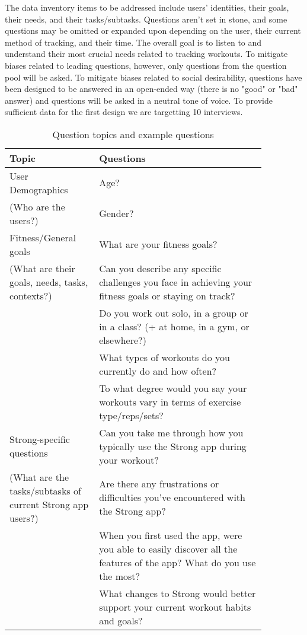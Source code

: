 \documentclass[
	letterpaper, %
]{jdf}
\begin{document}
The data inventory items to be addressed include users' identities, their goals, their needs, and their tasks/subtasks. Questions aren't set in stone, and some questions may be omitted or expanded upon depending on the user, their current method of tracking, and their time. The overall goal is to listen to and understand their most crucial needs related to tracking workouts.
To mitigate biases related to leading questions, however, only questions from the question pool will be asked. To mitigate biases related to social desirability, questions have been designed to be answered in an open-ended way (there is no "good" or "bad" answer) and questions will be asked in a neutral tone of voice. To provide sufficient data for the first design we are targetting 10 interviews. 
\begin{table}[H] %
	\caption{Question topics and example questions}
	\small %
	\centering %
	\begin{tabular}{L{0.30\linewidth} L{0.56\linewidth}}
		\textbf{Topic} & \textbf{Questions} \\
		\toprule[0.5pt]
		User Demographics & Age?\\
		(Who are the users?) & Gender?\\
		\midrule
		Fitness/General goals & What are your fitness goals?\\
		(What are their goals, needs, tasks, contexts?)& Can you describe any specific challenges you face in achieving your fitness goals or staying on track?\\
		& Do you work out solo, in a group or in a class? (+ at home, in a gym, or elsewhere?)\\
		& What types of workouts do you currently do and how often?\\
		& To what degree would you say your workouts vary in terms of exercise type/reps/sets?\\
		\midrule
		Strong-specific questions & Can you take me through how you typically use the Strong app during your workout?\\
		(What are the tasks/subtasks of current Strong app users?)& Are there any frustrations or difficulties you've encountered with the Strong app?\\
		& When you first used the app, were you able to easily discover all the features of the app? What do you use the most?\\
		& What changes to Strong would better support your current workout habits and goals?\\

\end{tabular}
\end{table}
\end{document}
